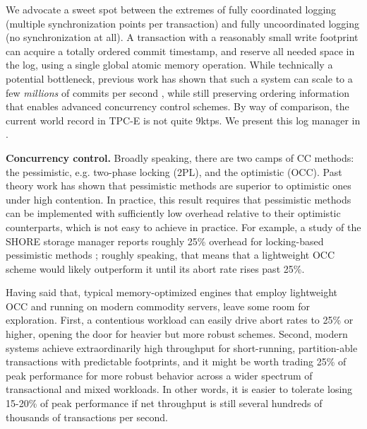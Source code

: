 We advocate a sweet spot between the extremes of fully coordinated logging (multiple synchronization points per transaction) and fully uncoordinated logging (no synchronization at all). A transaction with a reasonably small write footprint can acquire a totally ordered commit timestamp, and reserve all needed space in the log, using a single global atomic memory operation. While technically a potential bottleneck, previous work has shown that such a system can scale to a few {\em millions} of commits per second \cite{TuZKLM13}, while still preserving ordering information that enables advanced concurrency control schemes. By way of comparison, the current world record in TPC-E is not quite 9ktps. We present this log manager in .

\vspace{2mm} 
{\bf Concurrency control.} 
Broadly speaking, there are two camps of CC methods: the pessimistic, e.g. two-phase locking (2PL), and the optimistic (OCC). Past theory work \cite{AgrawalCL87} has shown that pessimistic methods are superior to optimistic ones under high contention. In practice, this result requires that pessimistic methods can be implemented with sufficiently low overhead relative to their optimistic counterparts, which is not easy to achieve in practice. For example, a study of the SHORE storage manager reports roughly 25\% overhead for locking-based pessimistic methods \cite{HarizopoulosAMS08}; roughly speaking, that means that a lightweight OCC scheme would likely outperform it until its abort rate rises past 25\%.

Having said that, typical memory-optimized engines that employ lightweight OCC and running on modern commodity servers, leave some room for exploration. First, a contentious workload can easily drive abort rates to 25\% or higher, opening the door for heavier but more robust schemes. Second, modern systems achieve extraordinarily high throughput for short-running, partition-able transactions with predictable footprints, and it might be worth trading 25\% of peak performance for more robust behavior across a wider spectrum of transactional and mixed workloads. In other words, it is easier to tolerate losing 15-20\% of peak performance if net throughput is still several hundreds of thousands of transactions per second.


